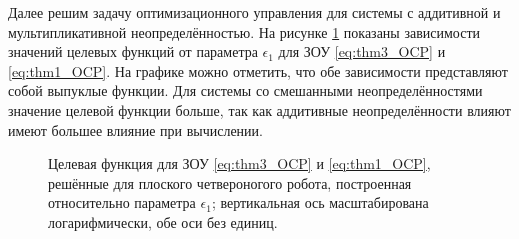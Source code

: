 Далее решим задачу оптимизационного управления для системы с аддитивной и мультипликативной неопределённостью. На рисунке \ref{fig:additive} показаны зависимости значений целевых функций от параметра $\epsilon_1$ для ЗОУ \eqref{eq:thm3_OCP} и \eqref{eq:thm1_OCP}. На графике можно отметить, что обе зависимости представляют собой выпуклые функции. Для системы со смешанными неопределённостями значение целевой функции больше, так как аддитивные неопределённости влияют имеют большее влияние при вычислении. 
\begin{figure}[ht]
	\caption{Целевая функция для ЗОУ \eqref{eq:thm3_OCP} и \eqref{eq:thm1_OCP}, решённые для плоского четвероногого робота, построенная относительно параметра $\epsilon_1$; вертикальная ось масштабирована логарифмически, обе оси без единиц.} \label{fig:additive}
\end{figure}

